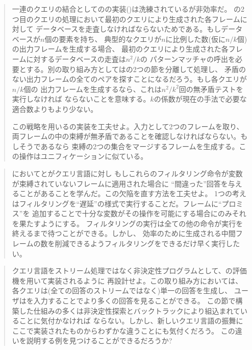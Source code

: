 \begin{quote}
一連のクエリの結合としてのの実装()は洗練されているが非効率だ。
の2つ目のクエリの処理において最初のクエリにより生成された各フレームに対して
データベースを走査しなければならないためである。もしデータベースが\( n \)個の要素を持ち、
典型的なクエリが\( n \)に比例した数(仮に\( n / k \)個)の出力フレームを生成する場合、
最初のクエリにより生成された各フレームに対するデータベースの走査は\( n^2\! / k \)の
パターンマッチャの呼出を必要とする。別の取り組み方としてはの2つの節を分離して処理し、
矛盾のない出力フレームの全てのペアを探すことになるだろう。もし各クエリが\( n / k \)個の
出力フレームを生成するなら、これは\( n^2\! / k^2 \)回の無矛盾テストを実行しなければ
ならないことを意味する。\( k \)の係数が現在の手法で必要な適合数よりもより少ない。


この戦略を用いるの実装を工夫せよ。入力として2つのフレームを取り、
両フレームの中の束縛が無矛盾であることを確認しなければならない。もしそうであるなら
束縛の2つの集合をマージするフレームを生成する。この操作はユニフィケーションに似ている。
\end{quote}

\begin{quote}
においてとがクエリ言語に対し
もしこれらのフィルタリング命令が変数が束縛されていないフレームに適用された場合に
``間違った''回答を与えることがあることを学んだ。この欠陥を直す方法を工夫せよ。
1つの考えはフィルタリングを``遅延''の様式で実行することだ。フレームに``プロミス''を
追加することで十分な変数がその操作を可能にする場合にのみそれを果たすようにする。
フィルタリングの実行は全ての他の命令が実行を終えるまで待つことができる。しかし、
効率のために生成される中間フレームの数を削減できるようフィルタリングをできるだけ早く実行したい。
\end{quote}

\begin{quote}
クエリ言語をストリーム処理ではなく非決定性プログラムとして、の評価機を用いて実装されるように
再設計せよ。この取り組み方においては、各クエリは(全ての回答のストリームではなく)単一の回答を生成し、
ユーザはを入力することでより多くの回答を見ることができる。
この節で構築した仕組みの多くは非決定性探索とバックトラックにより組込まれていることに気付かなければ
ならない。しかし、新しいクエリ言語の振舞にここで実装されたものからわずかな違うことにも気付くだろう。
この違いを説明する例を見つけることができるだろうか?
\end{quote}

